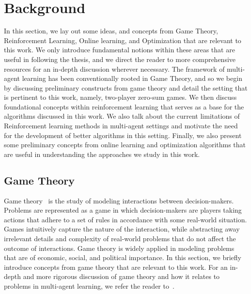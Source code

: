 \chapter{Background}
In this section, we lay out some ideas, and concepts from Game Theory, Reinforcement Learning,
Online learning, and Optimization that are relevant to this work.
We only introduce fundamental notions within these areas that are useful in following the thesis,
and we direct the reader to more comprehensive resources for an in-depth discussion wherever
necessary.
The framework of multi-agent learning has been conventionally rooted in Game Theory, and so we
begin by discussing preliminary constructs from game theory and detail the setting that is
pertinent to this work, namely, two-player zero-sum games.
We then discuss foundational concepts within reinforcement learning that serves as a base for the
algorithms discussed in this work.
We also talk about the current limitations of Reinforcement learning methods in multi-agent
settings and motivate the need for the development of better algorithms in this setting.
Finally, we also present some preliminary concepts from online learning and optimization algorithms
that are useful in understanding the approaches we study in this work.

\section{Game Theory}
Game theory~\cite{osborneintroduction2004} is the study of modeling interactions between
decision-makers.
Problems are represented as a game in which decision-makers are players taking actions that adhere
to a set of rules in accordance with some real-world situation.
Games intuitively capture the nature of the interaction, while abstracting away irrelevant details
and complexity of real-world problems that do not affect the outcome of interactions.
Game theory is widely applied in modeling problems that are of economic, social, and political
importance.
In this section, we briefly introduce concepts from game theory that are relevant to this work.
For an in-depth and more rigorous discussion of game theory and how it relates to problems in
multi-agent learning, we refer the reader to~\cite{nisanAlgorithmic2007a, shohamMultiagent2008}.

